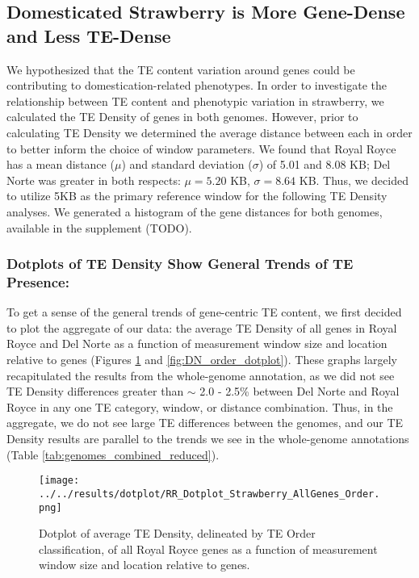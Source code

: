 \documentclass[fleqn,10pt]{olplainarticle}
\begin{document}
\subsection{Domesticated Strawberry is More Gene-Dense and Less TE-Dense}
We hypothesized that the TE content variation around genes could be contributing to domestication-related phenotypes.
In order to investigate the relationship between TE content and phenotypic variation in strawberry, we calculated the TE Density of genes in both genomes.
However, prior to calculating TE Density we determined the average distance between each in order to better inform the choice of window parameters.
We found that Royal Royce has a mean distance ($\mu$) and standard deviation ($\sigma$) of 5.01 and 8.08 KB; Del Norte was greater in both respects: $\mu = 5.20$ KB, $\sigma = 8.64$ KB.
Thus, we decided to utilize 5KB as the primary reference window for the following TE Density analyses.
We generated a histogram of the gene distances for both genomes, available in the supplement (TODO).

\subsubsection{Dotplots of TE Density Show General Trends of TE Presence:}
To get a sense of the general trends of gene-centric TE content, we first decided to plot the aggregate of our data: the average TE Density of all genes in Royal Royce and Del Norte as a function of measurement window size and location relative to genes (Figures \ref{fig:RR_order_dotplot} and \ref{fig:DN_order_dotplot}).
These graphs largely recapitulated the results from the whole-genome annotation, as we did not see TE Density differences greater than $\sim$ 2.0 - 2.5\% between Del Norte and Royal Royce in any one TE category, window, or distance combination.
Thus, in the aggregate, we do not see large TE differences between the genomes, and our TE Density results are parallel to the trends we see in the whole-genome annotations (Table \ref{tab:genomes_combined_reduced}).


\begin{figure}[ht]
\centering
\texttt{[image: ../../results/dotplot/RR\_Dotplot\_Strawberry\_AllGenes\_Order.png]}
\caption{Dotplot of average TE Density, delineated by TE Order classification, of all Royal Royce genes as a function of measurement window size and location relative to genes.}
\label{fig:RR_order_dotplot}
\end{figure}
\end{document}
